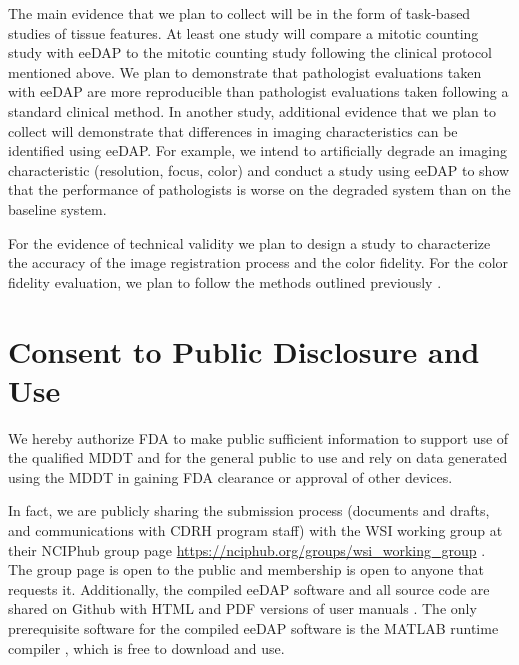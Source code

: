 \documentclass{article}%
\begin{document}
\label{plan-to-get-data}

The main evidence that we plan to collect will be in the form of task-based
studies of tissue features. At least one study will compare a mitotic counting
study with eeDAP to the mitotic counting study following the clinical protocol
mentioned above. We plan to demonstrate that pathologist evaluations taken
with eeDAP are more reproducible than pathologist evaluations taken following
a standard clinical method. In another study, additional evidence that we plan
to collect will demonstrate that differences in imaging characteristics can be
identified using eeDAP. For example, we intend to artificially degrade an
imaging characteristic (resolution, focus, color) and conduct a study using
eeDAP to show that the performance of pathologists is worse on the degraded
system than on the baseline system.

For the evidence of technical validity we plan to design a study to
characterize the accuracy of the image registration process and the color
fidelity. For the color fidelity evaluation, we plan to follow the methods
outlined previously \cite{Gallas2014_J-Med-Img_v1p037501}.

\section{Consent to Public Disclosure and Use}

\label{consent-to-public-disclosure-and-use}

We hereby authorize FDA to make public sufficient information to support use
of the qualified MDDT and for the general public to use and rely on data
generated using the MDDT in gaining FDA clearance or approval of other devices.

In fact, we are publicly sharing the submission process (documents and drafts,
and communications with CDRH program staff) with the WSI working group at
their NCIPhub group page
\url{https://nciphub.org/groups/wsi_working_group}%
. The group page is open to the public and membership is open to anyone that
requests it. Additionally, the compiled eeDAP software and all source code are
shared on Github with HTML and PDF versions of user manuals
\cite{Gallas2016_eeDAP_v4p0}. The only prerequisite software for the compiled
eeDAP software is the MATLAB runtime compiler \cite{MatlabRuntime2016}, which
is free to download and use.

\label{references}



\end{document}
